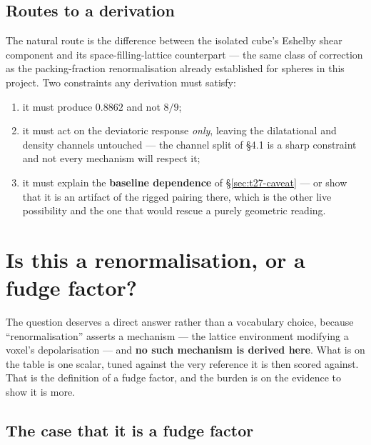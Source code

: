 \documentclass[11pt,a4paper]{article}
\begin{document}
\subsection{Routes to a derivation}

The natural route is the difference between the isolated cube's Eshelby shear
component and its space-filling-lattice counterpart --- the same class of
correction as the packing-fraction renormalisation already established for
spheres in this project. Two constraints any derivation must satisfy:
\begin{enumerate}[nosep]
  \item it must produce $0.8862$ and not $8/9$;
  \item it must act on the deviatoric response \emph{only}, leaving the
    dilatational and density channels untouched --- the channel split of \S4.1 is
    a sharp constraint and not every mechanism will respect it;
  \item it must explain the \textbf{baseline dependence} of
    \S\ref{sec:t27-caveat} --- or show that it is an artifact of the rigged
    pairing there, which is the other live possibility and the one that would
    rescue a purely geometric reading.
\end{enumerate}

\section{Is this a renormalisation, or a fudge factor?}
\label{sec:fudge}

The question deserves a direct answer rather than a vocabulary choice, because
``renormalisation'' asserts a mechanism --- the lattice environment modifying a
voxel's depolarisation --- and \textbf{no such mechanism is derived here}. What
is on the table is one scalar, tuned against the very reference it is then scored
against. That is the definition of a fudge factor, and the burden is on the
evidence to show it is more.

\subsection{The case that it is a fudge factor}
\end{document}
